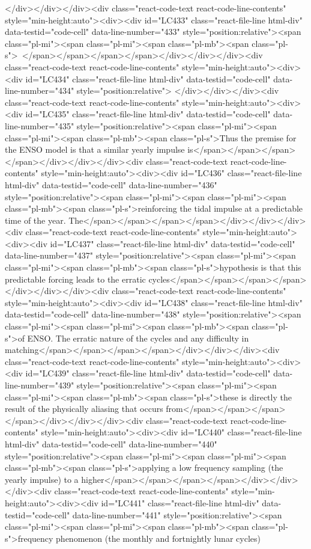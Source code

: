 {{{{{{</div></div></div><div class="react-code-text react-code-line-contents" style="min-height:auto"><div><div id="LC433" class="react-file-line html-div" data-testid="code-cell" data-line-number="433" style="position:relative"><span class="pl-mi"><span class="pl-mi"><span class="pl-mb"><span class="pl-s">~</span></span></span></span></div></div></div><div class="react-code-text react-code-line-contents" style="min-height:auto"><div><div id="LC434" class="react-file-line html-div" data-testid="code-cell" data-line-number="434" style="position:relative">
</div></div></div><div class="react-code-text react-code-line-contents" style="min-height:auto"><div><div id="LC435" class="react-file-line html-div" data-testid="code-cell" data-line-number="435" style="position:relative"><span class="pl-mi"><span class="pl-mi"><span class="pl-mb"><span class="pl-s">Thus the premise for the ENSO model is that a similar yearly impulse is</span></span></span></span></div></div></div><div class="react-code-text react-code-line-contents" style="min-height:auto"><div><div id="LC436" class="react-file-line html-div" data-testid="code-cell" data-line-number="436" style="position:relative"><span class="pl-mi"><span class="pl-mi"><span class="pl-mb"><span class="pl-s">reinforcing the tidal impulse at a predictable time of the year. The</span></span></span></span></div></div></div><div class="react-code-text react-code-line-contents" style="min-height:auto"><div><div id="LC437" class="react-file-line html-div" data-testid="code-cell" data-line-number="437" style="position:relative"><span class="pl-mi"><span class="pl-mi"><span class="pl-mb"><span class="pl-s">hypothesis is that this predictable forcing leads to the erratic cycles</span></span></span></span></div></div></div><div class="react-code-text react-code-line-contents" style="min-height:auto"><div><div id="LC438" class="react-file-line html-div" data-testid="code-cell" data-line-number="438" style="position:relative"><span class="pl-mi"><span class="pl-mi"><span class="pl-mb"><span class="pl-s">of ENSO. The erratic nature of the cycles and any difficulty in matching</span></span></span></span></div></div></div><div class="react-code-text react-code-line-contents" style="min-height:auto"><div><div id="LC439" class="react-file-line html-div" data-testid="code-cell" data-line-number="439" style="position:relative"><span class="pl-mi"><span class="pl-mi"><span class="pl-mb"><span class="pl-s">these is directly the result of the physically aliasing that occurs from</span></span></span></span></div></div></div><div class="react-code-text react-code-line-contents" style="min-height:auto"><div><div id="LC440" class="react-file-line html-div" data-testid="code-cell" data-line-number="440" style="position:relative"><span class="pl-mi"><span class="pl-mi"><span class="pl-mb"><span class="pl-s">applying a low frequency sampling (the yearly impulse) to a higher</span></span></span></span></div></div></div><div class="react-code-text react-code-line-contents" style="min-height:auto"><div><div id="LC441" class="react-file-line html-div" data-testid="code-cell" data-line-number="441" style="position:relative"><span class="pl-mi"><span class="pl-mi"><span class="pl-mb"><span class="pl-s">frequency phenomenon (the monthly and fortnightly lunar cycles) }}}}}}
